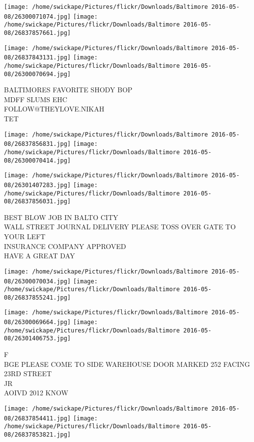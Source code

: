 \documentclass[10pt,letterpaper]{article}
\begin{document}
\texttt{[image: /home/swickape/Pictures/flickr/Downloads/Baltimore 2016-05-08/26300071074.jpg]}
\texttt{[image: /home/swickape/Pictures/flickr/Downloads/Baltimore 2016-05-08/26837857661.jpg]}

\texttt{[image: /home/swickape/Pictures/flickr/Downloads/Baltimore 2016-05-08/26837843131.jpg]}
\texttt{[image: /home/swickape/Pictures/flickr/Downloads/Baltimore 2016-05-08/26300070694.jpg]}

BALTIMORES FAVORITE SHODY BOP\\
MDFF SLUMS EHC\\
FOLLOW@THEYLOVE.NIKAH\\
TET\\
\pagebreak

\texttt{[image: /home/swickape/Pictures/flickr/Downloads/Baltimore 2016-05-08/26837856831.jpg]}
\texttt{[image: /home/swickape/Pictures/flickr/Downloads/Baltimore 2016-05-08/26300070414.jpg]}

\texttt{[image: /home/swickape/Pictures/flickr/Downloads/Baltimore 2016-05-08/26301407283.jpg]}
\texttt{[image: /home/swickape/Pictures/flickr/Downloads/Baltimore 2016-05-08/26837856031.jpg]}

BEST BLOW JOB IN BALTO CITY\\
WALL STREET JOURNAL DELIVERY PLEASE TOSS OVER GATE TO YOUR LEFT\\
INSURANCE COMPANY APPROVED\\
HAVE A GREAT DAY\\
\pagebreak

\texttt{[image: /home/swickape/Pictures/flickr/Downloads/Baltimore 2016-05-08/26300070034.jpg]}
\texttt{[image: /home/swickape/Pictures/flickr/Downloads/Baltimore 2016-05-08/26837855241.jpg]}

\texttt{[image: /home/swickape/Pictures/flickr/Downloads/Baltimore 2016-05-08/26300069664.jpg]}
\texttt{[image: /home/swickape/Pictures/flickr/Downloads/Baltimore 2016-05-08/26301406753.jpg]}

F\\
BGE PLEASE COME TO SIDE WAREHOUSE DOOR MARKED 252 FACING 23RD STREET\\
JR\\
AOIVD 2012 KNOW\\
\pagebreak

\texttt{[image: /home/swickape/Pictures/flickr/Downloads/Baltimore 2016-05-08/26837854411.jpg]}
\texttt{[image: /home/swickape/Pictures/flickr/Downloads/Baltimore 2016-05-08/26837853821.jpg]}
\end{document}
